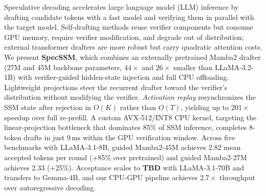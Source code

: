 Speculative decoding accelerates large language model (LLM) inference by drafting candidate tokens with a fast model and verifying them in parallel with the target model.
Self-drafting methods reuse verifier components but consume GPU memory, require verifier modification, and degrade out of distribution; external transformer drafters are more robust but carry quadratic attention costs.
We present \textbf{SpecSSM}, which combines an externally pretrained Mamba2 drafter (27M and 45M backbone parameters, $44\times$ and $26\times$ smaller than LLaMA-3.2-1B) with verifier-guided hidden-state injection and full CPU offloading.
Lightweight projections steer the recurrent drafter toward the verifier's distribution without modifying the verifier.
\emph{Activation replay} resynchronizes the SSM state after rejection in $O(K)$ rather than $O(T)$, yielding up to $201\times$ speedup over full re-prefill.
A custom AVX-512/INT8 CPU kernel, targeting the linear-projection bottleneck that dominates 85\% of SSM inference, completes 8-token drafts in just 9\,ms within the GPU verification window.
Across five benchmarks with LLaMA-3.1-8B, guided Mamba2-45M achieves 2.82 mean accepted tokens per round (+85\% over pretrained) and guided Mamba2-27M achieves 2.33 (+25\%).
Acceptance scales to \textbf{TBD} with LLaMA-3.1-70B and transfers to Gemma-4B, and our CPU-GPU pipeline achieves $2.7\times$ throughput over autoregressive decoding.